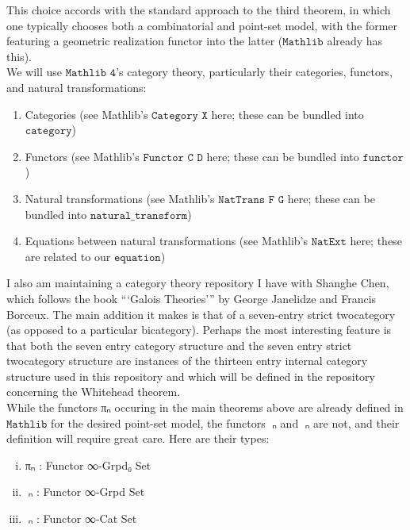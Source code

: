 \documentclass{book}
\theoremstyle{definition}
\begin{document}
This choice accords with the standard approach to the third theorem, in which one typically chooses both a combinatorial and point-set model, with the former featuring a geometric realization functor into the latter ($\texttt{Mathlib}$ already has this).\\

We will use $\texttt{Mathlib 4}$'s category theory, particularly their categories, functors, and natural transformations:

\begin{enumerate}
\item Categories (see Mathlib's $\texttt{Category X}$ here; these can be bundled into $\texttt{category}$)
\item Functors (see Mathlib's $\texttt{Functor C D}$ here; these can be bundled into $\texttt{functor}$)
\item Natural transformations (see Mathlib's $\texttt{NatTrans F G}$ here; these can be bundled into $\texttt{natural\_transform}$)
\item Equations between natural transformations (see Mathlib's $\texttt{NatExt}$ here; these are related to our $\texttt{equation}$)
\end{enumerate}

I also am maintaining a category theory repository I have with Shanghe Chen, which follows the book ```Galois Theories''' by George Janelidze and Francis Borceux. The main addition it makes is that of a seven-entry strict twocategory (as opposed to a particular bicategory). Perhaps the most interesting feature is that both the seven entry category structure and the seven entry strict twocategory structure are instances of the thirteen entry internal category structure used in this repository and which will be defined in the repository concerning the Whitehead theorem.\\

While the functors πₙ occuring in the main theorems above are already defined in $\texttt{Mathlib}$ for the desired point-set model, the functors π⃗ₙ and π⃡ₙ are not, and their definition will require great care. Here are their types:

\begin{enumerate}[(i)]
\item πₙ : Functor ∞-Grpd₀ Set
\item π⃡ₙ : Functor ∞-Grpd Set
\item π⃗ₙ : Functor ∞-Cat Set
\end{enumerate}
 
\end{document}

